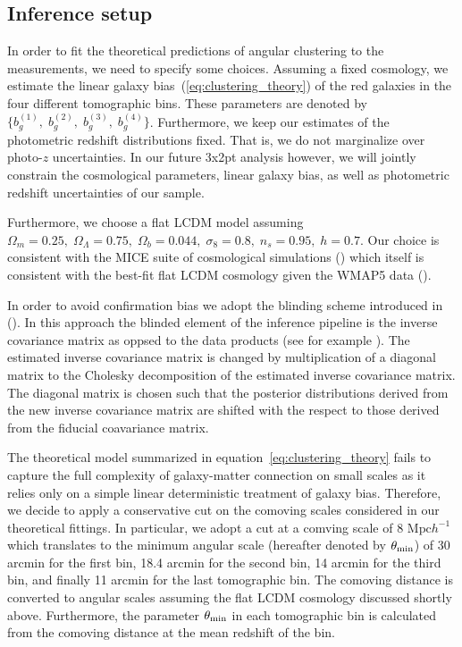 \documentclass[fleqn,usenatbib,useAMS]{mnras}
\begin{document}
\subsection{Inference setup}

In order to fit the theoretical predictions of angular clustering to the measurements, we need to specify some choices. Assuming a fixed cosmology, we estimate the linear galaxy bias~(\ref{eq:clustering_theory}) of the red galaxies in the four different tomographic bins. These parameters are denoted by $\{b^{(1)}_g, \; b^{(2)}_g, \; b^{(3)}_g, \; b^{(4)}_g\}$. Furthermore, we keep our estimates of the photometric redshift distributions fixed. That is, we do not marginalize over photo-$z$ uncertainties. In our future 3x2pt analysis however, we will jointly constrain the cosmological parameters, linear galaxy bias, as well as photometric redshift uncertainties of our sample. 

Furthermore, we choose a flat LCDM model assuming $\Omega_m = 0.25, \;\Omega_{\Lambda} = 0.75, \; \Omega_b = 0.044, \; \sigma_{8} = 0.8, \; n_s = 0.95, \; h = 0.7$. Our choice is consistent with the MICE suite of cosmological simulations (\citealt{MICE1}) which itself is consistent with the best-fit flat LCDM cosmology given the WMAP5 data (\citealt{WMAP5}). 

In order to avoid confirmation bias we adopt the blinding scheme introduced in (\citealt{sellentin2019}). In this approach the blinded element of the inference pipeline is the inverse covariance matrix as oppsed to the data products (see for example \citealt{hendrick2017, hendrik2018}). The estimated inverse covariance matrix is changed by multiplication of a diagonal matrix to the Cholesky decomposition of the estimated inverse covariance matrix. The diagonal matrix is chosen such that the posterior distributions derived from the new inverse covariance matrix are shifted with the respect to those derived from the fiducial coavariance matrix. 

The theoretical model summarized in equation~\ref{eq:clustering_theory} fails to capture the full complexity of galaxy-matter connection on small scales as it relies only on a simple linear deterministic treatment of galaxy bias. Therefore, we decide to apply a conservative cut on the comoving scales considered in our theoretical fittings. In particular, we adopt a cut at a comving scale of 8 $\mathrm{Mpc}h^{-1}$ which translates to the minimum angular scale (hereafter denoted by $\theta_{\rm min}$) of 30 arcmin for the first bin, 18.4 arcmin for the second bin, 14 arcmin for the third bin, and finally 11 arcmin for the last tomographic bin. The comoving distance is converted to angular scales assuming the flat LCDM cosmology discussed shortly above. Furthermore, the parameter $\theta_{\rm min}$ in each tomographic bin is calculated from the comoving distance at the mean redshift of the bin.
\end{document}

